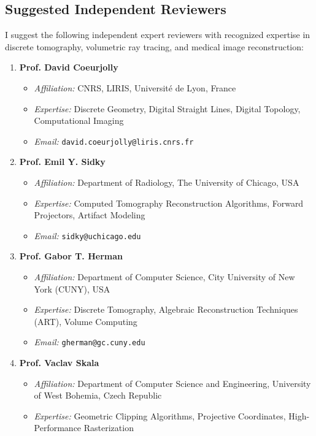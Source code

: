 \documentclass[11pt]{article}
\begin{document}
\subsection*{Suggested Independent Reviewers}
I suggest the following independent expert reviewers with recognized expertise in discrete tomography, volumetric ray tracing, and medical image reconstruction:

\begin{enumerate}
    \item \textbf{Prof. David Coeurjolly}
    \begin{itemize}
        \item \textit{Affiliation:} CNRS, LIRIS, Université de Lyon, France
        \item \textit{Expertise:} Discrete Geometry, Digital Straight Lines, Digital Topology, Computational Imaging
        \item \textit{Email:} \texttt{david.coeurjolly@liris.cnrs.fr}
    \end{itemize}
    \item \textbf{Prof. Emil Y. Sidky}
    \begin{itemize}
        \item \textit{Affiliation:} Department of Radiology, The University of Chicago, USA
        \item \textit{Expertise:} Computed Tomography Reconstruction Algorithms, Forward Projectors, Artifact Modeling
        \item \textit{Email:} \texttt{sidky@uchicago.edu}
    \end{itemize}
    \item \textbf{Prof. Gabor T. Herman}
    \begin{itemize}
        \item \textit{Affiliation:} Department of Computer Science, City University of New York (CUNY), USA
        \item \textit{Expertise:} Discrete Tomography, Algebraic Reconstruction Techniques (ART), Volume Computing
        \item \textit{Email:} \texttt{gherman@gc.cuny.edu}
    \end{itemize}
    \item \textbf{Prof. Vaclav Skala}
    \begin{itemize}
        \item \textit{Affiliation:} Department of Computer Science and Engineering, University of West Bohemia, Czech Republic
        \item \textit{Expertise:} Geometric Clipping Algorithms, Projective Coordinates, High-Performance Rasterization

\end{itemize}
\end{enumerate}
\end{document}
